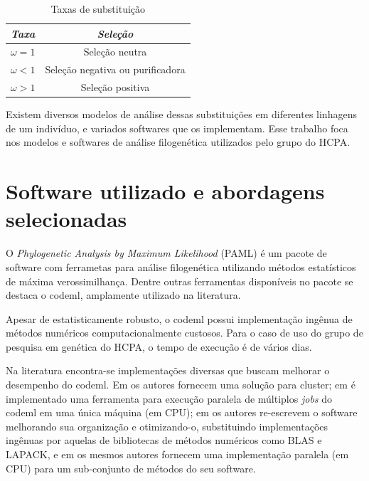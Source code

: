 \documentclass[cic,tc]{iiufrgs}
\begin{document}
\begin{table}[h]
    \caption{Taxas de substituição}
    \centering
        \begin{tabular}{c|c}
          \hline
          \textit{Taxa}  &   \textit{Seleção} \\
          \hline
          \hline
          $\omega = 1$ & Seleção neutra \\
          $\omega < 1$ & Seleção negativa ou purificadora \\
          $\omega > 1$ & Seleção positiva \\
          \hline
        \end{tabular}
    \label{tbl:ex1}
\end{table}

Existem diversos modelos de análise dessas substituições em diferentes
linhagens de um indivíduo, e variados softwares que os implementam. Esse
trabalho foca nos modelos e softwares de análise filogenética
utilizados pelo grupo do HCPA.

\section{Software utilizado e abordagens selecionadas}

O \textit{Phylogenetic Analysis by Maximum Likelihood} (PAML) é um pacote de
software com ferrametas para análise filogenética utilizando métodos
estatísticos de máxima verossimilhança.\cite{yang2007paml} Dentre
outras ferramentas disponíveis no pacote se destaca o codeml,
amplamente utilizado na literatura.\cite{maldonado2016lmap}

Apesar de estatisticamente robusto,\cite{maldonado2016lmap} o codeml
possui implementação ingênua de métodos numéricos computacionalmente
custosos.\cite{yang2020paml} Para o caso de uso do grupo de pesquisa em
genética do HCPA, o tempo de execução é de vários dias.

Na literatura encontra-se implementações diversas que buscam melhorar o
desempenho do codeml. Em \cite{moretti2012gcodeml} os autores fornecem
uma solução para cluster; em \cite{maldonado2016lmap} é implementado uma
ferramenta para execução paralela de múltiplos \textit{jobs} do codeml
em uma única máquina (em CPU); em \cite{schabauer2012slimcodeml} os autores
re-escrevem o software melhorando sua organização e otimizando-o,
substituindo implementações ingênuas por aquelas de bibliotecas de métodos
numéricos como BLAS e LAPACK, e em \cite{valle2014optimization} os
mesmos autores fornecem uma implementação paralela (em CPU) para um
sub-conjunto de métodos do seu software.
\end{document}
